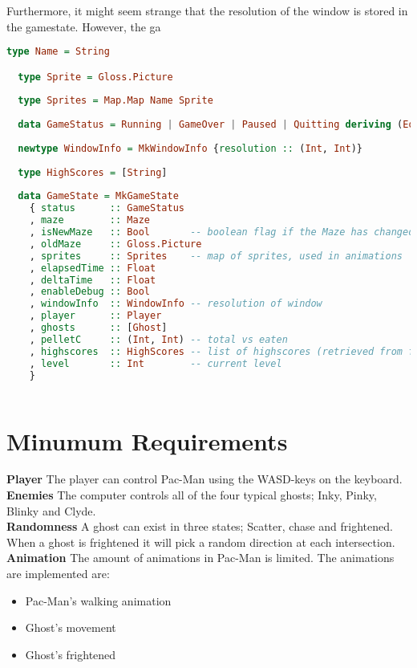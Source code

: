 \documentclass[11pt]{Article}
\begin{document}
Furthermore, it might seem strange that the resolution of the window is stored in the gamestate. However, the ga

\begin{lstlisting}[language=Haskell]
  type Name = String

  type Sprite = Gloss.Picture
  
  type Sprites = Map.Map Name Sprite
  
  data GameStatus = Running | GameOver | Paused | Quitting deriving (Eq, Show)
  
  newtype WindowInfo = MkWindowInfo {resolution :: (Int, Int)}
  
  type HighScores = [String]
  
  data GameState = MkGameState
    { status      :: GameStatus
    , maze        :: Maze
    , isNewMaze   :: Bool       -- boolean flag if the Maze has changed or not
    , oldMaze     :: Gloss.Picture
    , sprites     :: Sprites    -- map of sprites, used in animations
    , elapsedTime :: Float
    , deltaTime   :: Float
    , enableDebug :: Bool
    , windowInfo  :: WindowInfo -- resolution of window
    , player      :: Player
    , ghosts      :: [Ghost]
    , pelletC     :: (Int, Int) -- total vs eaten
    , highscores  :: HighScores -- list of highscores (retrieved from file)
    , level       :: Int        -- current level
    }
  
\end{lstlisting}


\section{Minumum Requirements} \label{ch:minumumRequirements}
\noindent \textbf{Player} The player can control Pac-Man using the WASD-keys on the keyboard.\\

\noindent \textbf{Enemies} The computer controls all of the four typical ghosts; Inky, Pinky, Blinky and Clyde.\\

\noindent \textbf{Randomness} A ghost can exist in three states; Scatter, chase and frightened. When a ghost is frightened it will pick a random direction at each intersection.\\

\noindent \textbf{Animation} The amount of animations in Pac-Man is limited. The animations are implemented are:
\begin{itemize}
  \item Pac-Man's walking animation
  \item Ghost's movement
  \item Ghost's frightened
\end{itemize}
\end{document}
